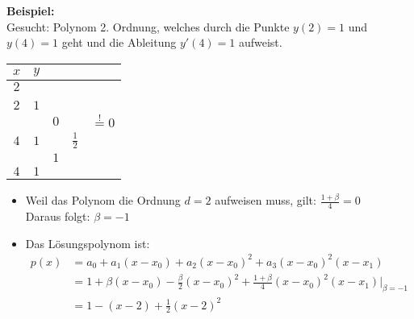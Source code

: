 \textbf{Beispiel:}\\
Gesucht: Polynom 2. Ordnung, welches durch die Punkte $y(2)=1$ und $y(4)=1$ geht und die Ableitung $y'(4)=1$ aufweist.

\begin{minipage}[c]{6cm}
	\renewcommand{\arraystretch}{1.0}
	\begin{tabular}{|c|llll|}
		\hline
		$x$	&\multicolumn{4}{l|}{$y$}\\
		\hline
		$2$	&\kreisS{$1$}{$a_0$}&	&&\\
			&	&\kreisS{$\beta$}{$a_1$}&&\\
		$2$	&$1$&	&\kreisB{$-\frac \beta2$}{$a_2$}&\\
			&	&$0$&				  &\kreisB{$\frac{1+\beta}{4}$}{$a_3$}$\overset{!}{=}0$\\
		$4$	&$1$&	&$\frac 12$&\\
			&	&$1$&&\\
		$4$	&$1$&	&&\\		
		\hline
	\end{tabular}
	\renewcommand{\arraystretch}{1.5}
\end{minipage}
\hfill
\begin{minipage}[c]{12cm}

	\vspace{0.5cm}
	
	\begin{itemize}
		\item Weil das Polynom die Ordnung $d=2$ aufweisen muss, gilt: $\frac{1+\beta}4=0$\\
		Daraus folgt: $\beta=-1$
		\item Das Lösungspolynom ist:
		\begin{align} p(x)&=a_0+a_1(x-x_0)+a_2(x-x_0)^2+a_3(x-x_0)^2(x-x_1)\nonumber\\
		&=1+\beta(x-x_0)-\frac \beta2(x-x_0)^2+\frac{1+\beta}4(x-x_0)^2(x-x_1)\big|_{\beta=-1}\nonumber\\
		&=1-(x-2)+\frac 12(x-2)^2\nonumber
		\end{align}
	\end{itemize}
\end{minipage}

\vfill
